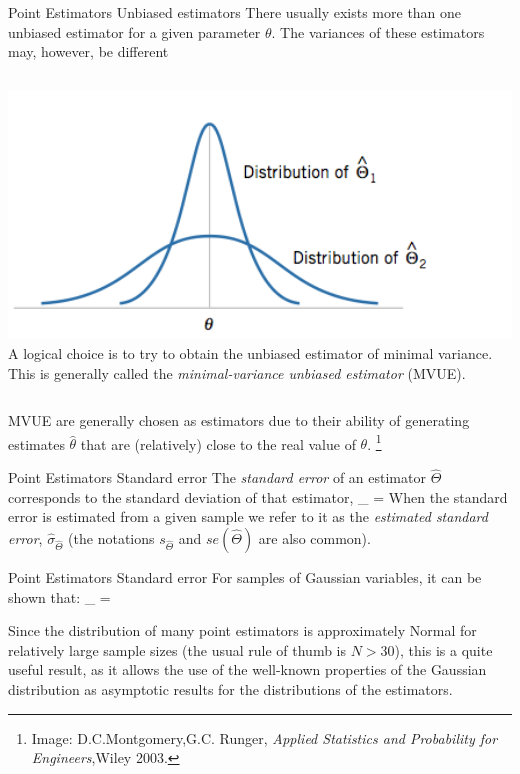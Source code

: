 \documentclass[t]{beamer}
\begin{document}
\begin{ftst}
{Point Estimators}
{Unbiased estimators}
There usually exists more than one unbiased estimator for a given parameter $\theta$. The variances of these estimators may, however, be different
\vone
\begin{columns}[T]
    \vspace{-1.5em} \includegraphics[width=1.2\textwidth]{../figs/ubes-var.png}
     A logical choice is to try to obtain the unbiased estimator of minimal variance. This is generally called the \textit{minimal-variance unbiased estimator} (MVUE).
\end{columns}
\vone
MVUE are generally chosen as estimators due to their ability of generating estimates $\hat{\theta}$ that are (relatively) close to the real value of $\theta$.
\let\thefootnote\relax\footnote{\tiny Image: D.C.Montgomery,G.C. Runger, \textit{Applied Statistics and Probability for Engineers},Wiley 2003.}
\end{ftst}


\begin{ftst}
{Point Estimators}
{Standard error}
The \textit{standard error} of an estimator $\hat{\Theta}$ corresponds to the standard deviation of that estimator,
\beqs
\sigma_{\hat{\Theta}} = 
\eqs
\vone
When the standard error is estimated from a given sample we refer to it as the \textit{estimated standard error},  $\hat{\sigma}_{\hat{\Theta}}$ (the notations $s_{\hat{\Theta}}$ and $se(\hat{\Theta})$ are also common).
\end{ftst}


\begin{ftst}
{Point Estimators}
{Standard error}
For samples of Gaussian variables, it can be shown that:
\beqs
\hat{\sigma}_{\hat{\Theta}} = 
\eqs

\vone
Since the distribution of many point estimators is approximately Normal for relatively large sample sizes (the usual rule of thumb is $N > 30$), this is a quite useful result, as it allows the use of the well-known properties of the Gaussian distribution as asymptotic results for the distributions of the estimators.
\end{ftst}
\end{document}
